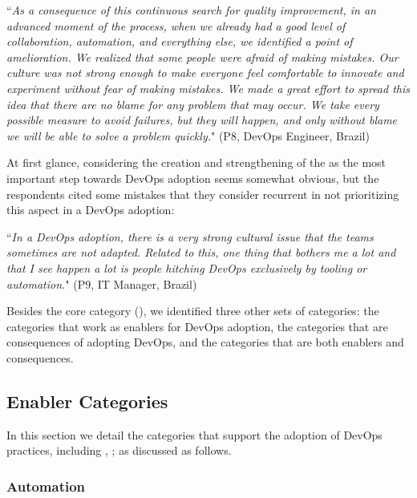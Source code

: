 \begin{mq}
``\emph{As a consequence of this continuous search for quality improvement, in an
advanced moment of the process, when we already had a good level of
collaboration, automation, and everything else, we identified a point of
amelioration. We realized that some people were afraid of making mistakes. Our
culture was not strong enough to make everyone feel comfortable to innovate and
experiment without fear of making mistakes. We made a great effort to spread
this idea that there are no blame for any problem that may occur. We take every possible
measure to avoid failures, but they
will happen, and only without blame we will be able to solve a problem quickly.}" (P8,
DevOps Engineer, Brazil)
\end{mq}

At first glance, considering the creation and strengthening of the  as the most important step towards DevOps adoption seems somewhat obvious, but
the respondents cited some mistakes that they consider recurrent in not
prioritizing this aspect in a DevOps adoption:

\begin{mq}``\emph{In a DevOps adoption, there is a very strong cultural issue that the teams
sometimes are not adapted. Related to this, one thing that bothers me a lot and
that I see happen a lot is people hitching DevOps exclusively by tooling or
automation.}" (P9, IT Manager, Brazil)
\end{mq}

Besides the core category (), we identified
three other sets of categories: the categories that work as enablers
for DevOps adoption, the categories that are consequences of adopting
DevOps, and the categories that are both enablers and consequences.

\subsection{Enabler Categories}

In this section we detail the categories that support the adoption of
DevOps practices, including , ;
as discussed as follows.

\subsubsection{Automation} \label{ssec:automation}

